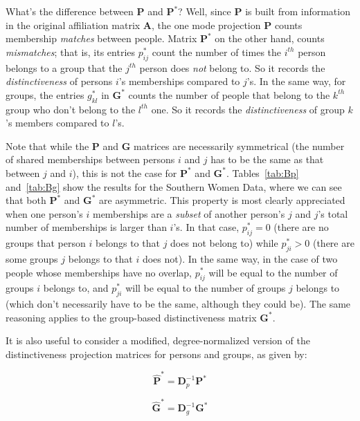 \documentclass[a4paper,fleqn]{cas-sc}
\begin{document}
What's the difference between $\mathbf{P}$ and $\mathbf{P^*}$? Well, since $\mathbf{P}$ is built from information in the original affiliation matrix $\mathbf{A}$, the one mode projection $\mathbf{P}$ counts membership \textit{matches} between people. Matrix $\mathbf{P^*}$ on the other hand, counts \textit{mismatches}; that is, its entries $p^*_{ij}$ count the number of times the $i^{th}$ person belongs to a group that the $j^{th}$ person does \textit{not} belong to. So it records the \textit{distinctiveness} of persons $i$'s memberships compared to $j$'s. In the same way, for groups, the entries $g^*_{kl}$ in $\mathbf{G^*}$ counts the number of people that belong to the $k^{th}$ group who don't belong to the $l^{th}$ one. So it records the \textit{distinctiveness} of group $k$'s members compared to $l$'s. 




Note that while the $\mathbf{P}$ and $\mathbf{G}$ matrices are necessarily symmetrical (the number of shared memberships between persons $i$ and $j$ has to be the same as that between $j$ and $i$), this is not the case for $\mathbf{P^*}$ and $\mathbf{G^*}$. Tables~\ref{tab:Bp} and~\ref{tab:Bg} show the results for the Southern Women Data, where we can see that both $\mathbf{P^*}$ and $\mathbf{G^*}$ are asymmetric. This property is most clearly appreciated when one person's $i$ memberships are a \textit{subset} of another person's $j$ and $j$'s total number of memberships is larger than $i$'s. In that case, $p^*_{ij} = 0$ (there are no groups that person $i$ belongs to that $j$ does not belong to) while $p^*_{ji} > 0$ (there are some groups $j$ belongs to that $i$ does not). In the same way, in the case of two people whose memberships have no overlap, $p^*_{ij}$ will be equal to the number of groups $i$ belongs to, and $p^*_{ji}$ will be equal to the number of groups $j$ belongs to (which don't necessarily have to be the same, although they could be).  The same reasoning applies to the group-based distinctiveness matrix $\mathbf{G^*}$.

It is also useful to consider a modified, degree-normalized version of the distinctiveness projection matrices for persons and groups, as given by: 

\begin{equation}
    \hat{\textbf{P}}^* = \textbf{D}_p^{-1}\textbf{P}^*
\end{equation}

\begin{equation}
    \hat{\textbf{G}}^* = \textbf{D}_g^{-1}\textbf{G}^*
\end{equation}
\end{document}
